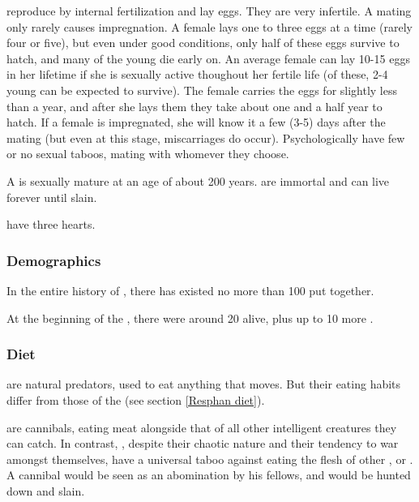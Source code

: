 \Dragons{} reproduce by internal fertilization and lay eggs. They are very infertile. A mating only rarely causes impregnation. A female lays one to three eggs at a time (rarely four or five), but even under good conditions, only half of these eggs survive to hatch, and many of the young die early on. An average female can lay 10-15 eggs in her lifetime if she is sexually active thoughout her fertile life (of these, 2-4 young can be expected to survive). The female carries the eggs for slightly less than a year, and after she lays them they take about one and a half year to hatch. If a female is impregnated, she will know it a few (3-5) days after the mating (but even at this stage, miscarriages do occur).  
Psychologically \dragons{} have few or no sexual taboos, mating with whomever they choose. 

A \dragon{} is sexually mature at an age of about 200 years. 
\Dragons{} are immortal and can live forever until slain. 

\Dragons{} have three hearts. 





\subsubsection{Demographics}
In the entire history of \Miith, there has existed no more than 100 \dragons put together.

At the beginning of the \thirdbanewar, there were around 20 \dragons alive, plus up to 10 more . 





\subsubsection{Diet}
\Dragons{} are natural predators, used to eat anything that moves. But their eating habits differ from those of the \resphain{} (see section \ref{Resphan diet}). 

\Resphain{} are cannibals, eating \resphan{} meat alongside that of all other intelligent creatures they can catch. In contrast, \dragons, despite their chaotic nature and their tendency to war amongst themselves, have a universal taboo against eating the flesh of other \dragons{}, \ophidians{} or \rachyth. A cannibal \dragon{} would be seen as an abomination by his fellows, and would be hunted down and slain. 

